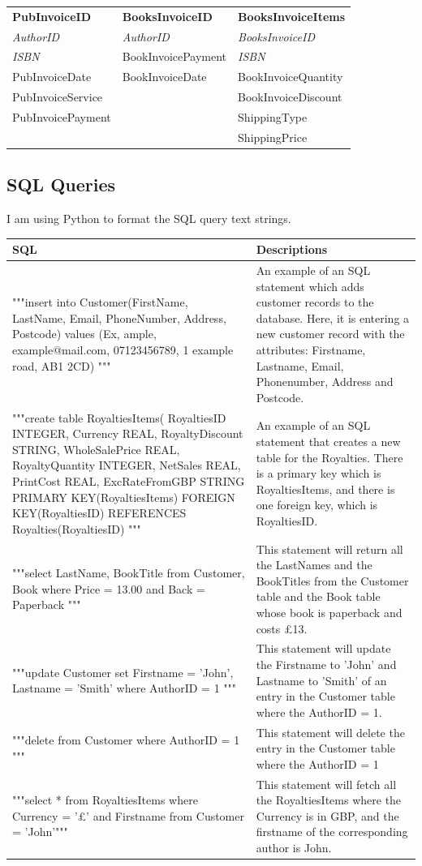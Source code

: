 \begin{tabular}{|p{3cm}|p{3.5cm}|p{3.5cm}|}
    \hline
    \textbf{PubInvoiceID} & \textbf{BooksInvoiceID} & \textbf{BooksInvoiceItems} \\
    \emph{AuthorID} & \emph{AuthorID} & \emph{BooksInvoiceID} \\
    \emph{ISBN}& BookInvoicePayment & \emph{ISBN} \\
    PubInvoiceDate & BookInvoiceDate & BookInvoiceQuantity \\
    PubInvoiceService & & BookInvoiceDiscount \\
    PubInvoicePayment & & ShippingType \\
    & & ShippingPrice \\
    \hline
\end{tabular}

\subsection{SQL Queries}

I am using Python to format the SQL query text strings.

\begin{tabular}{|p{6cm}|p{5cm}|}
    \hline
    \textbf{SQL} & \textbf{Descriptions} \\ \hline 
     """insert into Customer(FirstName, LastName, Email, PhoneNumber, Address, Postcode) values (Ex, ample, example@mail.com, 07123456789, 1 example road, AB1 2CD) """ & An example of an SQL statement which adds customer records to the database. Here, it is entering a new customer record with the attributes: Firstname, Lastname, Email, Phonenumber, Address and Postcode. \\ \hline
    """create table RoyaltiesItems( RoyaltiesID INTEGER,  Currency REAL,  RoyaltyDiscount STRING,  WholeSalePrice REAL, RoyaltyQuantity INTEGER, NetSales REAL, PrintCost REAL, ExcRateFromGBP STRING  PRIMARY KEY(RoyaltiesItems) FOREIGN KEY(RoyaltiesID) REFERENCES  Royalties(RoyaltiesID) """ & An example of an SQL statement that creates a new table for the Royalties. There is a primary key which is RoyaltiesItems, and there is one foreign key, which is RoyaltiesID. \\ \hline 
    """select LastName, BookTitle from Customer, Book where Price = 13.00 and  Back = Paperback """ & This statement will return all the LastNames and the BookTitles from the Customer table and the Book table whose book is paperback and costs £13. \\ \hline
    """update Customer set Firstname = 'John', Lastname = 'Smith' where AuthorID = 1 """ & This statement will update the Firstname to 'John' and Lastname to 'Smith' of an entry in the Customer table where the AuthorID = 1. \\ \hline
    """delete from Customer where AuthorID = 1 """ & This statement will delete the entry in the Customer table where the AuthorID = 1 \\ \hline
    """select * from RoyaltiesItems where Currency = '£' and Firstname from Customer = 'John'""" & This statement will fetch all the RoyaltiesItems where the Currency is in GBP, and the firstname of the corresponding author is John.
\end{tabular}

